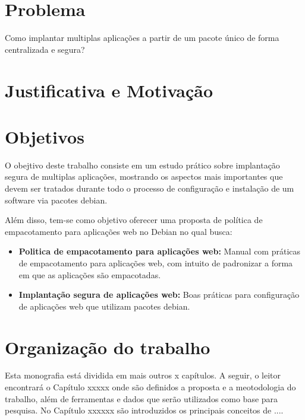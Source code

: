 \section{Problema}
%

Como implantar multiplas aplicações a partir de um pacote único de
forma centralizada e segura?

\section{Justificativa e Motivação}


\section{Objetivos}

%

O obejtivo deste trabalho consiste em um estudo prático sobre implantação segura
de multiplas aplicações, mostrando os aspectos mais importantes que devem ser
tratados durante todo o processo de configuração e instalação de um software via
pacotes debian.

%

Além disso, tem-se como objetivo oferecer uma proposta de política de
empacotamento para aplicações web no Debian no qual busca:

\begin{itemize}
  \item  \textbf{Politica de empacotamento para aplicações web:} Manual com
  práticas de empacotamento para aplicações web, com intuito de padronizar a
  forma em que as aplicações são empacotadas.
  \item  \textbf{Implantação segura de aplicações web:} Boas práticas para
  configuração de aplicações web que utilizam pacotes debian.
\end{itemize}

\section{Organização do trabalho}

%

Esta monografia está dividida em mais outros x capítulos. A seguir, o leitor
encontrará o Capítulo xxxxx onde são definidos a proposta e
a meotodologia do trabalho, além de ferramentas e dados que serão utilizados
como base para pesquisa. No Capítulo xxxxxx
são introduzidos os principais conceitos de  ....

